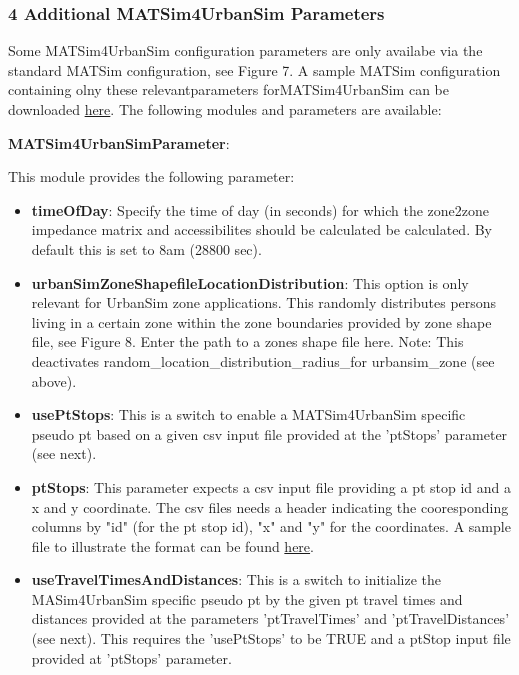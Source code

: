 \subsubsection{4 Additional MATSim4UrbanSim Parameters}

Some MATSim4UrbanSim configuration parameters are only availabe via the standard MATSim configuration, see Figure 7. A sample MATSim configuration containing olny these relevantparameters forMATSim4UrbanSim can be downloaded \href{https://svn.vsp.tu-berlin.de/repos/public-svn/matsim/examples/countries/us/seattle/external_matsim_config_with_matsim4urbansim_settings.xml}{here}. The following modules and parameters are available:

\textbf{MATSim4UrbanSimParameter}:

This module provides the following parameter:
\begin{itemize}
	\item \textbf{timeOfDay}: Specify the time of day (in seconds)  for which the zone2zone impedance matrix and accessibilites should be  calculated be calculated. By default this is set to 8am (28800 sec).
	\item \textbf{urbanSimZoneShapefileLocationDistribution}: This  option is only relevant for UrbanSim zone applications. This randomly  distributes persons living in a certain zone within the zone boundaries  provided by zone shape file, see Figure 8. Enter the path to a zones  shape file here. Note: This deactivates random\_location\_distribution\_radius\_for urbansim\_zone (see above).
	\item \textbf{usePtStops}: This is a switch to enable a  MATSim4UrbanSim specific pseudo pt based on a given csv input file  provided at the 'ptStops' parameter (see next).
	\item \textbf{ptStops}: This parameter expects a csv input file  providing a pt stop id and a x and y coordinate. The csv files needs a  header indicating the cooresponding columns by "id" (for the pt stop  id), "x" and "y" for the coordinates. A sample file to illustrate the  format can be found \href{https://svn.vsp.tu-berlin.de/repos/public-svn/matsim/examples/countries/us/seattle/ptStops.csv}{here}.
	\item \textbf{useTravelTimesAndDistances}: This is a switch to  initialize the MASim4UrbanSim specific pseudo pt by the given pt travel  times and distances provided at the parameters 'ptTravelTimes' and  'ptTravelDistances' (see next). This requires the 'usePtStops' to be TRUE and a ptStop input file provided at 'ptStops' parameter.

\end{itemize}
